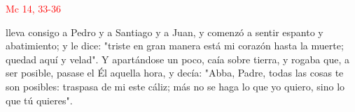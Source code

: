 \hfill\textcolor{red}{Mc 14, 33-36}

lleva consigo a Pedro y a Santiago y a Juan, y comenzó a sentir espanto y abatimiento; y le dice: "triste en gran manera está mi corazón hasta la muerte;
quedad aquí y velad". Y apartándose un poco, caía sobre tierra, y rogaba que, a ser posible, pasase el Él aquella hora, y decía: "Abba, Padre, todas las cosas te son posibles:
traspasa de mi este cáliz; más no se haga lo que yo quiero, sino lo que tú quieres".